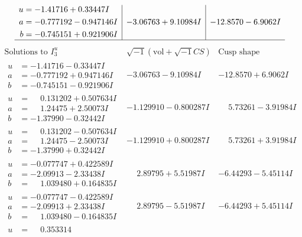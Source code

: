 \documentclass[1p]{elsarticle_modified}
\theoremstyle{definition}
\newcommand{\I}{\sqrt{-1}}
\begin{document}
$$\begin{array}{c|c|c}
\begin{aligned}
u &= -1.41716 + 0.33447 I \\
a &= -0.777192 - 0.947146 I \\
b &= -0.745151 + 0.921906 I\end{aligned}
 & -3.06763 + 9.10984 I & -12.8570 - 6.9062 I\\
 \hline 
 \end{array}$$\newpage$$\begin{array}{c|c|c}  
\text{Solutions to }I^u_{3}& \I (\text{vol} + \sqrt{-1}CS) & \text{Cusp shape}\\
 \hline 
\begin{aligned}
u &= -1.41716 - 0.33447 I \\
a &= -0.777192 + 0.947146 I \\
b &= -0.745151 - 0.921906 I\end{aligned}
 & -3.06763 - 9.10984 I & -12.8570 + 6.9062 I \\ \hline\begin{aligned}
u &= \phantom{-}0.131202 + 0.507634 I \\
a &= \phantom{-}1.24475 + 2.50073 I \\
b &= -1.37990 - 0.32442 I\end{aligned}
 & -1.129910 - 0.800287 I & \phantom{-}5.73261 - 3.91984 I \\ \hline\begin{aligned}
u &= \phantom{-}0.131202 - 0.507634 I \\
a &= \phantom{-}1.24475 - 2.50073 I \\
b &= -1.37990 + 0.32442 I\end{aligned}
 & -1.129910 + 0.800287 I & \phantom{-}5.73261 + 3.91984 I \\ \hline\begin{aligned}
u &= -0.077747 + 0.422589 I \\
a &= -2.09913 - 2.33438 I \\
b &= \phantom{-}1.039480 + 0.164835 I\end{aligned}
 & \phantom{-}2.89795 + 5.51987 I & -6.44293 - 5.45114 I \\ \hline\begin{aligned}
u &= -0.077747 - 0.422589 I \\
a &= -2.09913 + 2.33438 I \\
b &= \phantom{-}1.039480 - 0.164835 I\end{aligned}
 & \phantom{-}2.89795 - 5.51987 I & -6.44293 + 5.45114 I \\ \hline\begin{aligned}
u &= \phantom{-}0.353314\phantom{ +0.000000I} \\

\end{aligned}
\end{array}$$
\end{document}
